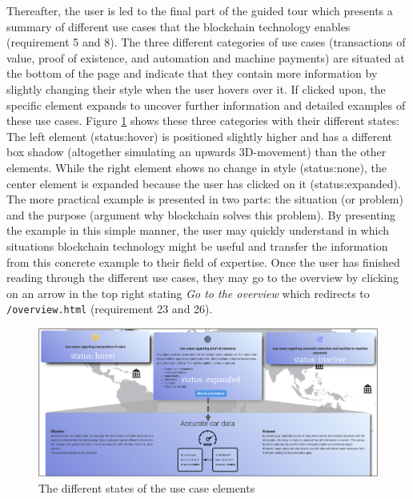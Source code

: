 Thereafter, the user is led to the final part of the guided tour which presents a summary of different use cases that the blockchain technology enables (requirement 5 and 8). The three different categories of use cases (transactions of value, proof of existence, and automation and machine payments) are situated at the bottom of the page and indicate that they contain more information by slightly changing their style when the user hovers over it. If clicked upon, the specific element expands to uncover further information and detailed examples of these use cases. Figure \ref{fig:AnimUC} shows these three categories with their different states: The left element (status:hover) is positioned slightly higher and has a different box shadow (altogether simulating an upwards 3D-movement) than the other elements. While the right element shows no change in style (status:none), the center element is expanded because the user has clicked on it (status:expanded). The more practical example is presented in two parts: the situation (or problem) and the purpose (argument why blockchain solves this problem). By presenting the example in this simple manner, the user may quickly understand in which situations blockchain technology might be useful and transfer the information from this concrete example to their field of expertise. Once the user has finished reading through the different use cases, they may go to the overview by clicking on an arrow in the top right stating \textit{Go to the overview} which redirects to \texttt{/overview.html} (requirement 23 and 26). 

\begin{figure}
    \centering
    \includegraphics[width=\linewidth]{graphics/AnimationUseCases.png}
    \caption{The different states of the use case elements}
    \label{fig:AnimUC}
\end{figure}


